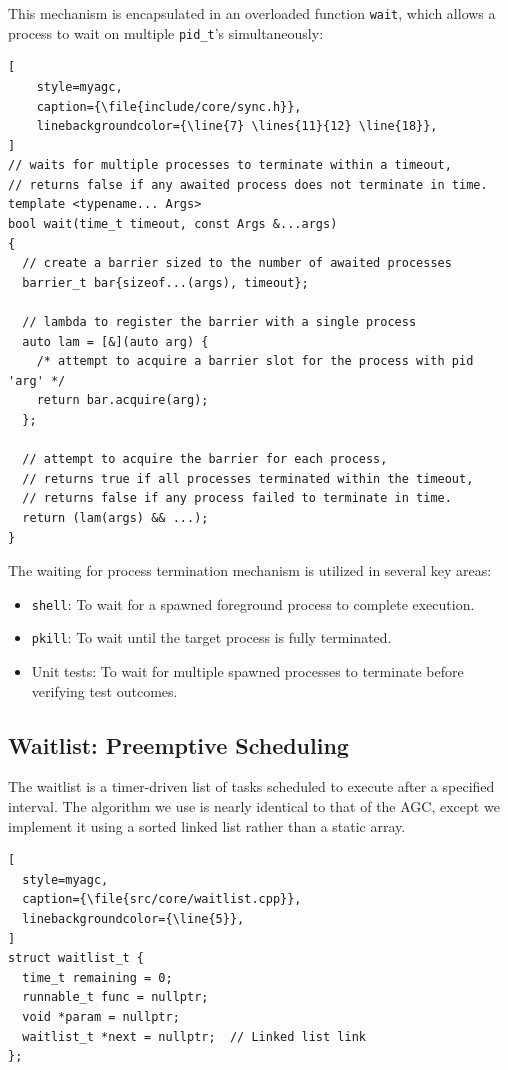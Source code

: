 This mechanism is encapsulated in an overloaded function \lstinline[style=myagc]|wait|,
which allows a process to wait on multiple \lstinline[style=myagc]|pid_t|'s
simultaneously:

\begin{lstlisting}[
    style=myagc,
    caption={\file{include/core/sync.h}},
    linebackgroundcolor={\line{7} \lines{11}{12} \line{18}},
]
// waits for multiple processes to terminate within a timeout,
// returns false if any awaited process does not terminate in time.
template <typename... Args>
bool wait(time_t timeout, const Args &...args)
{
  // create a barrier sized to the number of awaited processes
  barrier_t bar{sizeof...(args), timeout};

  // lambda to register the barrier with a single process
  auto lam = [&](auto arg) {
    /* attempt to acquire a barrier slot for the process with pid 'arg' */
    return bar.acquire(arg);
  };

  // attempt to acquire the barrier for each process,
  // returns true if all processes terminated within the timeout,
  // returns false if any process failed to terminate in time.
  return (lam(args) && ...);
}
\end{lstlisting}

The waiting for process termination mechanism is utilized in several key areas:
\begin{itemize}
    \item \lstinline[style=mytty]|shell|: To wait for a spawned foreground process to
        complete execution.
    \item \lstinline[style=mytty]|pkill|: To wait until the target process is fully
        terminated.
    \item Unit tests: To wait for multiple spawned processes to terminate before
        verifying test outcomes.
\end{itemize}



\subsection{Waitlist: Preemptive Scheduling}
\label{sec:waitlist}

The waitlist is a timer-driven list of tasks scheduled to execute after a specified
interval. The algorithm we use is nearly identical to that of the AGC, except we
implement it using a sorted linked list rather than a static array.

\begin{lstlisting}[
  style=myagc,
  caption={\file{src/core/waitlist.cpp}},
  linebackgroundcolor={\line{5}},
]
struct waitlist_t {
  time_t remaining = 0;
  runnable_t func = nullptr;
  void *param = nullptr;
  waitlist_t *next = nullptr;  // Linked list link
};
\end{lstlisting}

